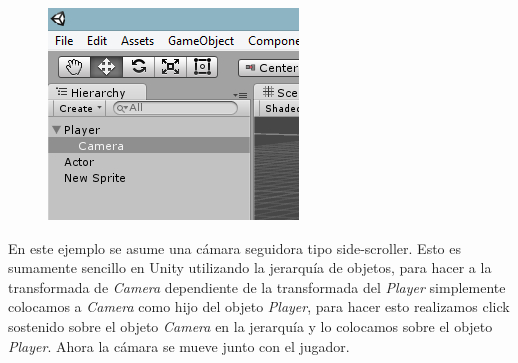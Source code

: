 \begin{figure}
\includegraphics[width=\linewidth]{media/1_ss9.jpg} 
\end{figure}
En este ejemplo se asume una cámara seguidora tipo side-scroller. Esto es sumamente sencillo en Unity utilizando la jerarquía de objetos, para hacer a la transformada de \emph{Camera} dependiente de la transformada del \emph{Player} simplemente colocamos a \emph{Camera} como hijo del objeto \emph{Player}, para hacer esto realizamos click sostenido sobre el objeto \emph{Camera} en la jerarquía y lo colocamos sobre el objeto \emph{Player}. Ahora la cámara se mueve junto con el jugador.